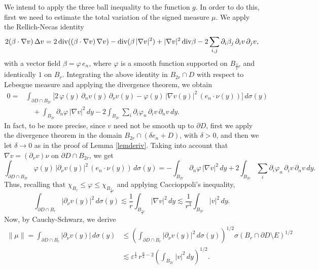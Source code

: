 \documentclass[11pt]{amsart}
\newcommand{\vphi}{{\varphi}}
\newcommand{\ve}{{\varepsilon}}
\theoremstyle{definition}
\theoremstyle{remark}
\numberwithin{equation}{section}
\begin{document}
We intend to apply the three ball inequality to the function $g$. In order to do
this, first we need to estimate the total variation of the signed measure $\mu$.  We apply the Rellich-Necas identity 
$$2(\beta \cdot \nabla v)\,\Delta v = 2\,{\rm div}((\beta\cdot\nabla v)\,\nabla v) -
{\rm div}(\beta\,|\nabla v|^2) + |\nabla v|^2\,{\rm div}\beta  - 2 \sum_{i,j}\partial_i\beta_j\,
\partial_i v\,\partial_j v,$$
with a vector field $\beta = \vphi\,e_n$, where $\vphi$ is a smooth function supported on
$B_{\frac32r}$ and identically $1$ on $B_r$. Integrating the above identity in $B_{2r}\cap D$ with 
respect to Lebesgue measure and applying the divergence theorem, we obtain
\begin{align*}
0= & \int_{\partial D\cap B_{2r}} \big[2\,\vphi(y)\, \partial_n v(y)\,\partial_\nu v(y) - 
\vphi(y) \,|\nabla v(y)|^2 \,(e_n\cdot \nu(y)) \big]\,d\sigma(y)\\
&\quad + \int_{B_{2r}}\partial_n\vphi\,|\nabla v|^2\,dy - 2 \int_{B_{2r}}\sum_{i}\partial_i\vphi_n\,
\partial_i v\,\partial_n v\,dy.
\end{align*}
In fact, to be more precise, since $v$ need not be smooth up to $\partial D$, first we apply
the divergence theorem in the domain $B_{2r}\cap (\delta e_n + D)$, with $\delta>0$, and then we let
$\delta\to 0$ as in the proof of Lemma \ref{lemderiv}.
Taking into account that $\nabla v= (\partial_\nu v)\nu$ on $\partial D\cap B_{2r}$, we get
$$\int_{\partial D\cap B_{2r}}
\vphi(y) \,|\partial_\nu v(y)|^2 \,(e_n\cdot \nu(y)) \,d\sigma(y) =
 -\int_{B_{2r}}\!\partial_n\vphi\,|\nabla v|^2\,dy + 2 \int_{B_{2r}}\sum_{i}\partial_i\vphi_n\,
\partial_i v\,\partial_n v\,dy.$$
Thus, recalling that $\chi_{B_r}\leq \vphi\leq \chi_{B_{\frac32 r}}$ and applying Caccioppoli's
inequality,
$$\int_{\partial D\cap B_{r}}
|\partial_\nu v(y)|^2 \,d\sigma(y) \lesssim \frac1r \int_{B_{\frac32r}}|\nabla v|^2\,dy
\lesssim \frac1{r^3} \int_{B_{2r}}|v|^2\,dy
.$$
Now, by Cauchy-Schwarz, we derive
\begin{align*}
\|\mu\|  = \int_{\partial D\cap B_{r}}
|\partial_\nu v(y)| \,d\sigma(y) & \leq 
\left(\int_{\partial D\cap B_{r}}
|\partial_\nu v(y)|^2 \,d\sigma(y)\right)^{1/2}
\sigma(B_r\cap \partial D\setminus E)^{1/2}\\
& \lesssim \ve^{\frac12}\, r^{\frac n2 -2}  \left(\int_{B_{2r}}|v|^2\,dy\right)^{1/2}.
\end{align*}
\end{document}
